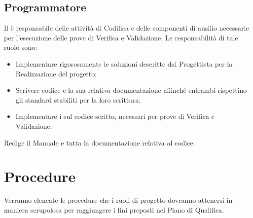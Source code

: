 \subsection{Programmatore}
\label{2.6}
Il  è responsabile delle attività di Codifica e delle componenti di ausilio
necessarie per l'esecuzione delle prove di Verifica e Validazione. Le responsabilità di tale ruolo sono:
\begin{itemize}
\item Implementare rigorosamente le soluzioni descritte dal Progettista per la Realizzazione del progetto;
\item Scrivere codice e la sua relativa documentazione affinché entrambi rispettino gli standard stabiliti per la loro scrittura;
\item Implementare i  sul codice scritto, necessari per prove di Verifica e Validazione.
\end{itemize}
Redige il Manuale  e tutta la documentazione relativa al codice.



\newpage
\section{Procedure}
\label{6.0}
Verranno elencate le procedure che i ruoli di progetto dovranno attenersi in maniera scrupolosa per raggiungere i fini preposti nel Piano di Qualifica.

